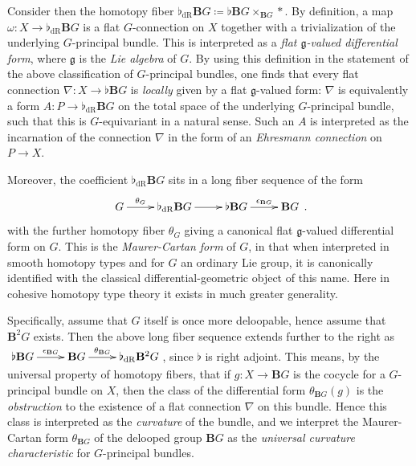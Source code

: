\documentclass[copyright,12pt]{eptcs}
\begin{document}
Consider then the homotopy fiber
$
  \flat_{\mathrm{dR}} \mathbf{B}G \coloneqq \flat \mathbf{B}G \times_{\mathbf{B}G} {*}
$.
By definition, %
a map $\omega : X \to \flat_{\mathrm{dR}} \mathbf{B}G$ is a
flat $G$-connection on $X$ together with a trivialization of the underlying
$G$-principal bundle. This is interpreted
as a \emph{flat $\mathfrak{g}$-valued differential form}, where $\mathfrak{g}$ is the \emph{Lie algebra}
of $G$. By using this definition in the statement of the above classification of $G$-principal bundles,
one finds that every flat connection
$\nabla : X \to \flat \mathbf{B}G$ is \emph{locally} given by a flat $\mathfrak{g}$-valued form:
$\nabla$ is equivalently a form $A : P \to \flat_{\mathrm{dR}} \mathbf{B}G$ on the total space
of the underlying $G$-principal bundle, such that this is $G$-equivariant in a natural sense.
Such an $A$ is interpreted as the incarnation of the connection $\nabla$
in the form of an \emph{Ehresmann connection} on $P \to X$.

Moreover, the coefficient $\flat_{\mathrm{dR}}\mathbf{B}G$ sits in
a long fiber sequence of the form
\[
  \xymatrix{
    G
   \ar[r]^-{\theta_G}
    &
    \flat_{\mathrm{dR}}\mathbf{B}G
   \ar[r]
  &
    \flat \mathbf{B}G
   \ar[r]^-{\epsilon_{\mathbf{B}G}}
  &
  \mathbf{B}G
  }
  \,.
\]
with the further homotopy fiber $\theta_{G}$
giving a canonical flat $\mathfrak{g}$-valued differential form on $G$. This is
the \emph{Maurer-Cartan form} of $G$, in that when interpreted in smooth homotopy types
and for $G$ an ordinary Lie group, it is canonically identified with the classical
differential-geometric object of this name. Here in cohesive homotopy type theory it
exists in much greater generality.

Specifically, assume that $G$ itself is once more
deloopable, hence assume that $\mathbf{B}^2 G$ exists. Then
the above long fiber sequence extends further to the right as
$
  \xymatrix{
    \flat \mathbf{B}G
   \ar[r]^-{\epsilon_{\mathbf{B}G}}
  &
  \mathbf{B}G
   \ar[r]^-{\theta_{\mathbf{B}G}}
  &
  \flat_{\mathrm{dR}} \mathbf{B}^2 G
  }
$, since $\flat$ is right adjoint.
This means, by the universal property of homotopy fibers, that if $g : X \to \mathbf{B}G$ is the
cocycle for a $G$-principal bundle on $X$, then the class of the differential form $\theta_{\mathbf{B}G}(g)$ is the \emph{obstruction} to the existence of a flat
connection $\nabla$ on this bundle. Hence
this class is interpreted as the \emph{curvature} of the bundle, and we interpret
the Maurer-Cartan form
$\theta_{\mathbf{B}G}$ of the delooped group $\mathbf{B}G$
as the \emph{universal curvature characteristic} for $G$-principal bundles.
\end{document}
